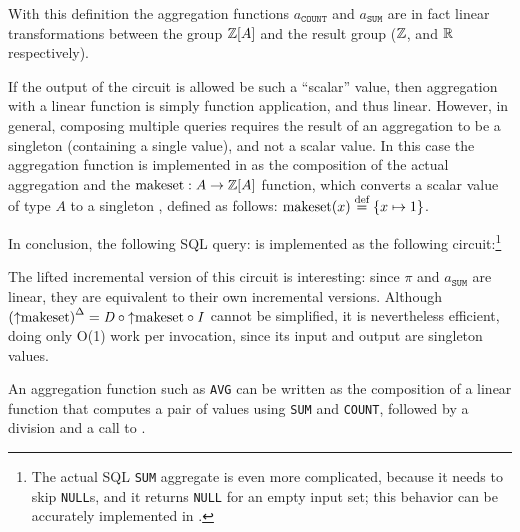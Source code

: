 With this definition the aggregation functions $a_\texttt{COUNT}$ and $a_\texttt{SUM}$ are in
fact linear transformations between the group $\mathbb{Z}[A]$ and the result group ($\mathbb{Z}$, and $\mathbb{R}$ respectively).

If the output of the \dbsp circuit is allowed be such a ``scalar'' value, then aggregation
with a linear function is simply function application, and thus linear.  
However, in general, composing multiple queries
requires the result of an aggregation to be a singleton \zr (containing a single value),
and not a scalar value.  In this case the aggregation function is implemented in
\dbsp as the composition of the actual aggregation and the 
$\mbox{makeset}: A \to \mathbb{Z}[A]$ function, 
which converts a scalar value of type $A$ to a singleton \zr, defined as follows:
$\mbox{makeset}(x) \stackrel{\textrm{\scriptsize def}}{=} \{ x \mapsto 1 \}$.

In conclusion, the following SQL query: 
is implemented as the following circuit:\footnote{The actual SQL \texttt{SUM} aggregate is
even more complicated, because it needs to skip \texttt{NULL}s, 
and it returns \texttt{NULL} for an empty input set; 
this behavior can be accurately implemented in \dbsp.}


The lifted incremental version of this circuit is interesting: since $\pi$ 
and $a_\texttt{SUM}$ are linear, they are equivalent to their own incremental 
versions.  Although ${({\uparrow}\mbox{makeset})}^{\Delta} = \mathit{D} \circ {\uparrow}\mbox{makeset} \circ \mathit{I}$
cannot be simplified, it is nevertheless efficient, doing only O(1) work per
invocation, since its input and output are singleton values.

An aggregation function such as \texttt{AVG} can be written as the composition of 
a linear function that computes a pair of values using 
\texttt{SUM} and \texttt{COUNT}, followed by a division and a call to \makeset.

%

